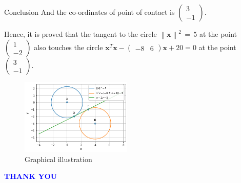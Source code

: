\documentclass{beamer}
\newcommand\norm[1]{\left\lVert#1\right\rVert}
\renewcommand{\vec}[1]{\mathbf{#1}}
\theoremstyle{remark}
\providecommand{\norm}[1]{\lVert#1\rVert}
\newcommand{\myvec}[1]{\ensuremath{\begin{pmatrix}#1\end{pmatrix}}}
\numberwithin{equation}{subsection}
\let\vec\mathbf
\begin{document}
\begin{frame}{Conclusion}
    And the co-ordinates of point of contact is $\myvec{3\\-1}$.
    
Hence, it is proved that the tangent to the circle $\norm{\vec{x}}^2\,=\,5$ at the point \myvec{1\\-2} also touches the circle $  \vec{x}^T\vec{x}-\myvec{-8 & 6}\vec{x}+20 = 0$ at the point $\myvec{3\\-1}$.
\begin{figure}[htp]
    \centering
    \includegraphics[width=53mm]{a_3.png}
    \caption{Graphical illustration}
    \label{fig:my_label}
\end{figure}
\end{frame}


\begin{frame}
   \centering
    \textcolor{blue}{\Huge{\textbf{THANK YOU}}}
\end{frame}
\end{document}
